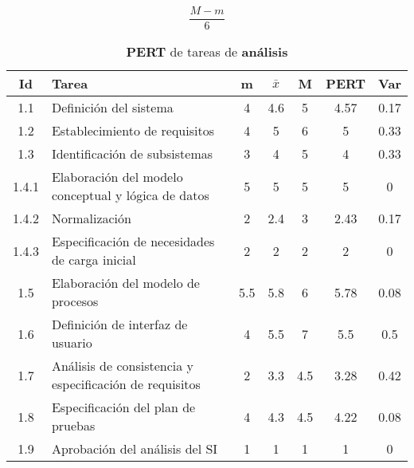 \documentclass[11pt,a4paper,spanish,twoside]{report}
\begin{document}
{\begin{displaymath} \frac{M-m}{6} \end{displaymath}

\begin{table}[!h]
  \centering
  \begin{tabular}{|c||p{5.3cm}||c|c|c||c|c|}
    \hline
    \textbf{Id} & \textbf{Tarea} & \textbf{m} & 
    \textbf{$\bar{x}$} &\textbf{M} & \textbf{PERT} & \textbf{Var}\\
    \hline \hline
    1.1 & Definición del sistema & 4 & 4.6 & 5 & 4.57 & 0.17\\ 
    \hline
    1.2 & Establecimiento de requisitos & 4 & 5 & 6 & 5 & 0.33\\
    \hline 
    1.3 & Identificación de subsistemas & 3 & 4 & 5 & 4 & 0.33\\
    \hline
    1.4.1 & Elaboración del modelo conceptual y lógica de datos & 5 & 5 & 5 &
    5 & 0\\
    \hline
    1.4.2 & Normalización & 2 & 2.4 & 3 & 2.43 & 0.17\\
    \hline
    1.4.3 & Especificación de necesidades de carga inicial & 2 & 2 & 2 & 2 & 0\\
    \hline
    1.5 & Elaboración del modelo de procesos & 5.5 & 5.8 & 6 & 5.78 & 0.08\\
    \hline
    1.6 & Definición de interfaz de usuario & 4 & 5.5 & 7 & 5.5 & 0.5\\
    \hline
    1.7 & Análisis de consistencia y especificación de requisitos & 2 & 3.3
    & 4.5 & 3.28 & 0.42\\
    \hline
    1.8 & Especificación del plan de pruebas & 4 & 4.3 & 4.5 & 4.22 & 0.08\\
    \hline
    1.9 & Aprobación del análisis del SI & 1 & 1 & 1 & 1 & 0\\
    \hline
  \end{tabular}
  \caption{\textbf{PERT} de tareas de \textbf{análisis}} 
  \label{Tab:PERTanal}
\end{table}

}
\end{document}
